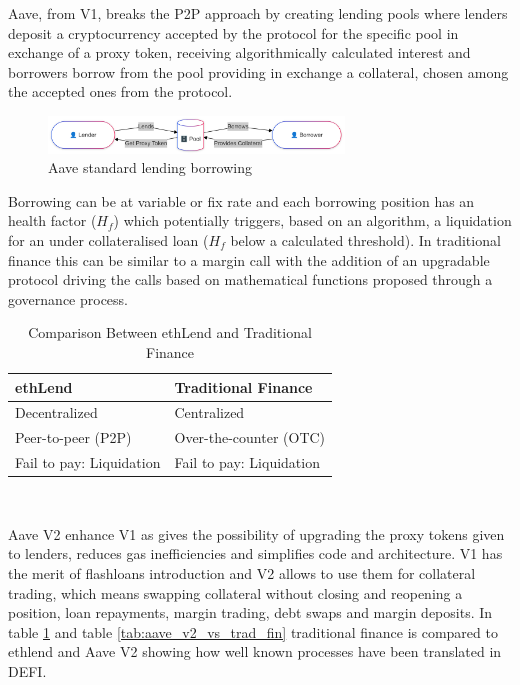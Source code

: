 \documentclass[11pt,a4paper,titlepage]{scrartcl}
\begin{document}
Aave, from V1, breaks the P2P approach by creating lending pools where lenders deposit a cryptocurrency accepted by the protocol for the specific pool in exchange of a proxy token, receiving algorithmically calculated interest and borrowers borrow from the pool providing in exchange a collateral, chosen among the accepted ones from the protocol.
\begin{figure}[ht]
    \includegraphics[width=0.7\textwidth]{image/lenderborrower.png}
    \caption{Aave standard lending borrowing}
\end{figure}
Borrowing can be at variable or fix rate and each borrowing position has an health factor ($H_f$) which potentially triggers, based on an algorithm, a liquidation for an under collateralised loan ($H_f$ below a calculated threshold). In traditional finance this can be similar to a margin call  with the addition of an upgradable protocol driving the calls based on mathematical functions proposed through a governance process.

\begin{table}[ht]
\centering
\caption{Comparison Between ethLend and Traditional Finance}
\begin{tabular}{ll}\toprule
\textbf{ethLend} & \textbf{Traditional Finance} \\ \midrule
Decentralized     & Centralized                \\
Peer-to-peer (P2P) & Over-the-counter (OTC)     \\
Fail to pay: Liquidation & Fail to pay: Liquidation \\ \bottomrule
\end{tabular}\\
\label{tab:ethlend_vs_trad_fin}
\end{table}

Aave V2 enhance V1 as gives the possibility of upgrading the proxy tokens given to lenders, reduces gas inefficiencies and simplifies code and architecture.
V1 has the merit of flashloans introduction and V2 allows to use them for collateral trading, which means swapping collateral without closing and reopening a position, loan repayments, margin trading, debt swaps and margin deposits. In table  \ref{tab:ethlend_vs_trad_fin} and table
 \ref{tab:aave_v2_vs_trad_fin} traditional finance is compared to ethlend and Aave V2 showing how well known processes have been translated in DEFI. 
\end{document}
